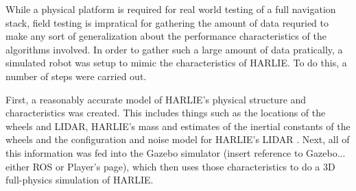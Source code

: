 While a physical platform is required for real world testing of a full navigation stack, field testing is impratical for gathering the amount of data requried to make any sort of generalization about the performance characteristics of the algorithms involved. In order to gather such a large amount of data pratically, a simulated robot was setup to mimic the characteristics of HARLIE. To do this, a number of steps were carried out.

First, a reasonably accurate model of HARLIE's physical structure and characteristics was created. This includes things such as the locations of the wheels and LIDAR, HARLIE's mass and estimates of the inertial constants of the wheels and the configuration and noise model for HARLIE's LIDAR . Next, all of this information was fed into the Gazebo simulator (\todo insert reference to Gazebo... either ROS or Player's page), which then uses those characteristics to do a 3D full-physics simulation of HARLIE.


